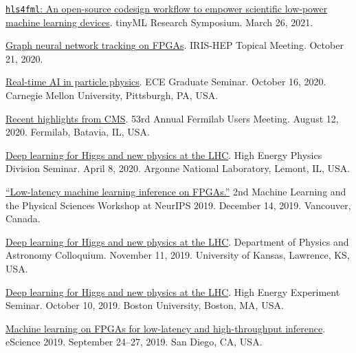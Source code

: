 \documentclass[11pt]{res}
\begin{document}
\begin{resume}
\href{https://www.tinyml.org/event/research-symposium-2021/}{\texttt{hls4fml}: An open-source codesign workflow to empower scientific low-power machine learning devices}. tinyML Research Symposium. March 26, 2021.

\href{https://indico.cern.ch/event/955026/}{Graph neural network tracking on FPGAs}. IRIS-HEP Topical Meeting. October 21, 2020.

\href{https://www.cs.cmu.edu/calendar/fri-2020-10-16-1200/ece-graduate-seminar}{Real-time AI in particle physics}. ECE Graduate Seminar. October 16, 2020. Carnegie Mellon University, Pittsburgh, PA, USA.

\href{https://indico.fnal.gov/event/23109/contributions/193292/}{Recent highlights from CMS}. 53rd Annual Fermilab Users Meeting. August 12, 2020. Fermilab, Batavia, IL, USA.

\href{https://indico.fnal.gov/event/22961/}{Deep learning for Higgs and new physics at the LHC}. High Energy Physics Division Seminar. April 8, 2020. Argonne National Laboratory, Lemont, IL, USA.



\href{https://ml4physicalsciences.github.io/2019/files/NeurIPS_ML4PS_2019_74.pdf}{``Low-latency machine learning inference on FPGAs.''} 2nd Machine Learning and the Physical Sciences Workshop at NeurIPS 2019.  December 14, 2019. Vancouver, Canada.

\href{https://physics.drupal.ku.edu/calendar/colloquia#/?i=2}{Deep learning for Higgs and new physics at the LHC}. Department of Physics and Astronomy Colloquium. November 11, 2019. University of Kansas, Lawrence, KS, USA.

\href{http://physics.bu.edu/events/show/2204}{Deep learning for Higgs and new physics at the LHC}. High Energy Experiment Seminar. October 10, 2019. Boston University, Boston, MA, USA.

\href{https://escience2019.sdsc.edu/program}{Machine learning on FPGAs for low-latency and high-throughput inference}. eScience 2019. September 24–27, 2019. San Diego, CA, USA.


\end{resume}
\end{document}
